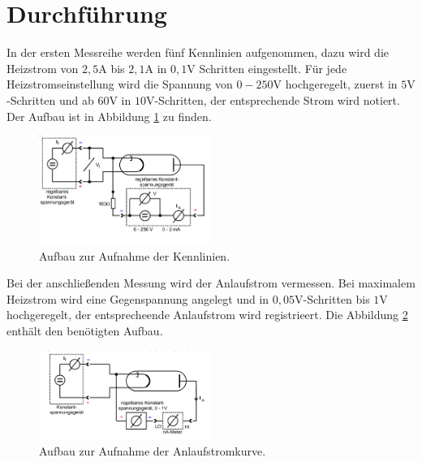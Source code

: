 \section{Durchführung}
\label{sec:Durchführung}
In der ersten Messreihe werden fünf Kennlinien aufgenommen, dazu wird die Heizstrom von $2,5\si{\ampere}$ bis $2,1\si{\ampere}$
in $0,1\si{\volt}$ Schritten eingestellt. Für jede Heizstromseinstellung wird die Spannung von $0-250\si{\volt}$ hochgeregelt,
zuerst in $5\si{\volt}$-Schritten und ab $60\si{\volt}$ in $10\si{\volt}$-Schritten,
der entsprechende Strom wird notiert. Der Aufbau ist in Abbildung \ref{fig:aufbau1} zu finden.
\begin{figure}
 \centering
 \includegraphics[width=0.5\textwidth]{Aufbaukenn.png}
 \caption{Aufbau zur Aufnahme der Kennlinien.\cite{sample}}
 \label{fig:aufbau1}
 \end{figure}

Bei der anschließenden Messung wird der Anlaufstrom vermessen. Bei maximalem Heizstrom wird eine Gegenspannung angelegt und
in $0,05\si{\volt}$-Schritten bis $1\si{\volt}$ hochgeregelt, der entsprecheende Anlaufstrom wird registrieert.
Die Abbildung \ref{fig:aufbau2} enthält den benötigten Aufbau.
\begin{figure}
 \centering
 \includegraphics[width=0.5\textwidth]{Aufbauan.png}
 \caption{Aufbau zur Aufnahme der Anlaufstromkurve.\cite{sample}}
 \label{fig:aufbau2}
 \end{figure}
